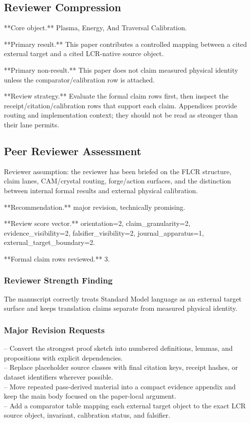 \documentclass[11pt]{article}
\begin{document}
\subsection*{Reviewer Compression}

**Core object.** Plasma, Energy, And Traversal Calibration.

**Primary result.** This paper contributes a controlled mapping between a cited external target and a cited LCR-native source object.

**Primary non-result.** This paper does not claim measured physical identity unless the comparator/calibration row is attached.

**Review strategy.** Evaluate the formal claim rows first, then inspect the receipt/citation/calibration rows that support each claim. Appendices provide routing and implementation context; they should not be read as stronger than their lane permits.

\subsection*{Peer Reviewer Assessment}

Reviewer assumption: the reviewer has been briefed on the FLCR structure, claim lanes, CAM/crystal routing, forge/action surfaces, and the distinction between internal formal results and external physical calibration.

**Recommendation.** major revision, technically promising.

**Review score vector.** orientation=2, claim\_granularity=2, evidence\_visibility=2, falsifier\_visibility=2, journal\_apparatus=1, external\_target\_boundary=2.

**Formal claim rows reviewed.** 3.

\subsubsection*{Reviewer Strength Finding}

The manuscript correctly treats Standard Model language as an external target surface and keeps translation claims separate from measured physical identity.

\subsubsection*{Major Revision Requests}

\noindent{}-- Convert the strongest proof sketch into numbered definitions, lemmas, and propositions with explicit dependencies.\\
\noindent{}-- Replace placeholder source classes with final citation keys, receipt hashes, or dataset identifiers wherever possible.\\
\noindent{}-- Move repeated pass-derived material into a compact evidence appendix and keep the main body focused on the paper-local argument.\\
\noindent{}-- Add a comparator table mapping each external target object to the exact LCR source object, invariant, calibration status, and falsifier.\\
\end{document}
